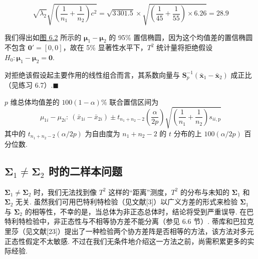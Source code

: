 \[
\sqrt{\lambda_2}\sqrt{\left(\frac{1}{n_1}+\frac{1}{n_2}\right)c^2}=\sqrt{3\,301.5}\times\sqrt{\left(\frac{1}{45}+\frac{1}{55}\right)\times 6.26}=28.9
\]

\begin{mvfigure}
\centering
{}
\label{fig:6.2}
\end{mvfigure}

我们得出如\hyperref[fig:6.2]{图 6.2} 所示的 $\boldsymbol{\mu}_1-\boldsymbol{\mu}_2$ 的 95\% 置信椭圆，因为这个均值差的置信椭圆不包含 $\mathbf{0}'=[0,0]$，故在 5\% 显著性水平下，$T^2$ 统计量将拒绝假设 $H_0: \boldsymbol{\mu}_1-\boldsymbol{\mu}_2=\mathbf{0}$.

对拒绝该假设起主要作用的线性组合而言，其系数向量与 $\mathbf{S}_p^{-1}(\bar{\mathbf{x}}_1-\bar{\mathbf{x}}_2)$ 成正比（见练习 6.7）.\hfill$\blacksquare$

$p$ 维总体均值差的 $100(1-\alpha)\%$ 联合置信区间为
\[
\mu_{1i}-\mu_{2i}:\ (\bar{x}_{1i}-\bar{x}_{2i})\pm t_{n_1+n_2-2}\left(\frac{\alpha}{2p}\right)\sqrt{\left(\frac{1}{n_1}+\frac{1}{n_2}\right)s_{ii,\mathrm{p}}}
\]
其中的 $t_{n_1+n_2-2}(\alpha/2p)$ 为自由度为 $n_1+n_2-2$ 的 $t$ 分布的上 $100(\alpha/2p)$ 百分位数.

\subsection{\texorpdfstring{$\boldsymbol{\Sigma}_1\neq\boldsymbol{\Sigma}_2$}{Sigma1!=Sigma2} 时的二样本问题}

$\boldsymbol{\Sigma}_1\neq\boldsymbol{\Sigma}_2$ 时，我们无法找到像 $T^2$ 这样的“距离”测度，$T^2$ 的分布与未知的 $\boldsymbol{\Sigma}_1$ 和 $\boldsymbol{\Sigma}_2$ 无关. 虽然我们可用巴特利特检验（见文献[3]）以广义方差的形式来检验 $\boldsymbol{\Sigma}_1$ 与 $\boldsymbol{\Sigma}_2$ 的相等性，不幸的是，当总体为非正态总体时，结论将受到严重误导. 在巴特利特检验中，非正态性与不相等协方差不能分离（参见 6.6 节）. 蒂库和巴拉克里莎（见文献[23]）提出了一种检验两个协方差阵是否相等的方法，该方法对多元正态性假定不太敏感. 不过在我们无条件地介绍这一方法之前，尚需积累更多的实际经验.

